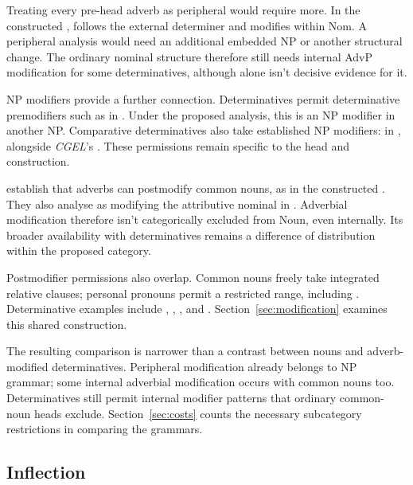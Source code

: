 \documentclass[12pt]{article}
\begin{document}
Treating every pre-head adverb as peripheral would require more. In the constructed ,  follows the external determiner and modifies  within Nom. A peripheral analysis would need an additional embedded NP or another structural change. The ordinary nominal structure therefore still needs internal AdvP modification for some determinatives, although  alone isn't decisive evidence for it.

NP modifiers provide a further connection. Determinatives permit determinative premodifiers such as  in  \citep[393]{huddleston2002}. Under the proposed analysis, this is an NP modifier in another NP. Comparative determinatives also take established NP modifiers:  in , alongside \textit{CGEL}'s  \citep[432]{huddleston2002}. These permissions remain specific to the head and construction.

\textcite[42--47]{payne2010} establish that adverbs can postmodify common nouns, as in the constructed . They also analyse  as modifying the attributive nominal  in  \citep[p.~75, n.~3]{payne2010}. Adverbial modification therefore isn't categorically excluded from Noun, even internally. Its broader availability with determinatives remains a difference of distribution within the proposed category.

Postmodifier permissions also overlap. Common nouns freely take integrated relative clauses; personal pronouns permit a restricted range, including  \citep[430]{huddleston2002}. Determinative examples include , , , and . Section~\ref{sec:modification} examines this shared construction.

The resulting comparison is narrower than a contrast between nouns and adverb-modified determinatives. Peripheral modification already belongs to NP grammar; some internal adverbial modification occurs with common nouns too. Determinatives still permit internal modifier patterns that ordinary common-noun heads exclude. Section~\ref{sec:costs} counts the necessary subcategory restrictions in comparing the grammars.

\subsection{Inflection}\label{sec:inflection}
\end{document}
